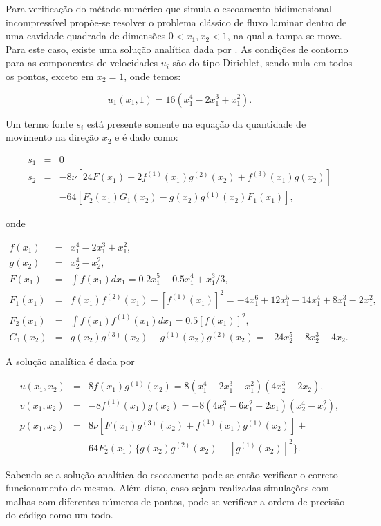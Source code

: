 Para verificação do método numérico que simula o escoamento bidimensional
incompressível propõe-se resolver o problema clássico de fluxo laminar dentro
de uma cavidade quadrada de dimensões $0< x_1, x_2 < 1$, na qual a tampa se
move. Para este caso, existe uma solução analítica dada por
\cite{shihetal1989}. As condições de contorno para as componentes de
velocidades $u_i$ são do tipo Dirichlet, sendo nula em todos os pontos, exceto
em $x_2=1$, onde temos:

\[
 u_1(x_1,1)=16(x_1^4-2x_1^3+x_1^2).
\]

Um termo fonte $s_i$ está presente somente na equação da quantidade de movimento
na direção $x_2$ e é dado como:

\begin{eqnarray}
s_1 &=& 0 \nonumber \\
s_2 &=& -8\nu[24F(x_1)+2f^{(1)}(x_1)g^{(2)}(x_2)+f^{(3)}(x_1)g(x_2)] \nonumber \\
 && -64[F_2(x_1)G_1(x_2)-g(x_2)g^{(1)}(x_2)F_1(x_1)]\nonumber ,
\end{eqnarray}

\noindent onde

\begin{eqnarray}
  f(x_1)&=&x_1^4-2x_1^3+x_1^2,\nonumber \\
  g(x_2)&=&x_2^4-x_2^2,\nonumber \\
  F(x_1)&=&\int f(x_1)dx_1=0.2x_1^5-0.5x_1^4+x_1^3/3,\nonumber \\
  F_1(x_1)&=&f(x_1)f^{(2)}(x_1)-[f^{(1)}(x_1)]^2=-4x_1^6+12x_1^5-14x_1^4+8x_1^3-2x_1^2,\nonumber \\
  F_2(x_1)&=&\int f(x_1)f^{(1)}(x_1)dx_1=0.5[f(x_1)]^2,\nonumber \\
  G_1(x_2)&=&g(x_2)g^{(3)}(x_2)-g^{(1)}(x_2)g^{(2)}(x_2)=-24x_2^5+8x_2^3-4x_2\nonumber .
\end{eqnarray}

A solução analítica é dada por

\begin{eqnarray}
   u(x_1, x_2) &=& 8f(x_1)g^{(1)}(x_2)=8(x_1^4 - 2x_1^3 + x_1^2)(4x_2^3 - 2x_2),\nonumber \\
   v(x_1, x_2) &=& -8f^{(1)}(x_1)g(x_2)=-8(4x_1^3 - 6x_1^2 + 2x_1)(x_2^4 - x_2^2),\nonumber \\
   p(x_1, x_2) &=& 8\nu[F(x_1)g^{(3)}(x_2)+f^{(1)}(x_1)g^{(1)}(x_2)]+ \nonumber \\
               && 64F_2(x_1)\{g(x_2)g^{(2)}(x_2)-[g^{(1)}(x_2)]^2\}\nonumber .
\end{eqnarray}

Sabendo-se a solução analítica do escoamento pode-se então verificar o correto
funcionamento do mesmo. Além disto, caso sejam realizadas simulações com malhas
com diferentes números de pontos, pode-se verificar a ordem de precisão do
código como um todo.


